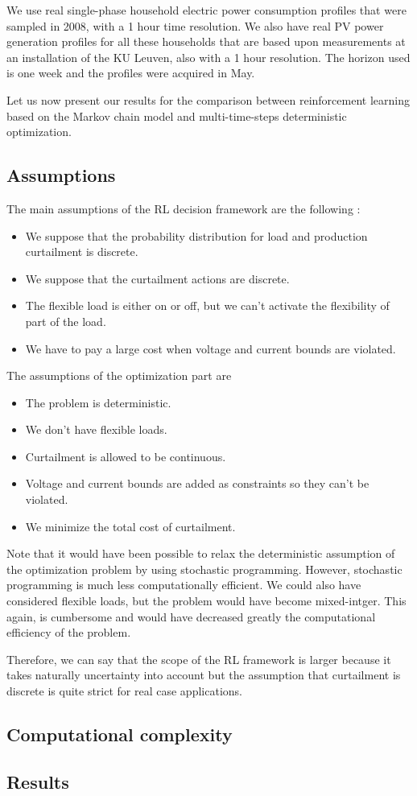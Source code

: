

We use real single-phase household electric power consumption profiles that were sampled in 2008, with a 1 hour time resolution.
We also have real PV power generation profiles for all these households that are based upon measurements at an installation of the KU Leuven, also with a 1 hour resolution.
The horizon used is one week and the profiles were acquired in May.

Let us now present our results for the comparison between reinforcement learning based on the Markov chain model and multi-time-steps deterministic optimization.

\subsection{Assumptions}

The main assumptions of the RL decision framework are the following :
\begin{itemize}
\item We suppose that the probability distribution for load and production curtailment is discrete.
\item We suppose that the curtailment actions are discrete.
\item The flexible load is either on or off, but we can't activate the flexibility of part of the load.
\item We have to pay a large cost when voltage and current bounds are violated.
\end{itemize}

The assumptions of the optimization part are
\begin{itemize}
\item The problem is deterministic.
\item We don't have flexible loads.
\item Curtailment is allowed to be continuous.
\item Voltage and current bounds are added as constraints so they can't be violated.
\item We minimize the total cost of curtailment. 
\end{itemize}

Note that it would have been possible to relax the deterministic assumption of the optimization problem by using stochastic programming.
However, stochastic programming is much less computationally efficient.
We could also have considered flexible loads, but the problem would have become mixed-intger.
This again, is cumbersome and would have decreased greatly the computational efficiency of the problem.

Therefore, we can say that the scope of the RL framework is larger because it takes naturally uncertainty into account but the assumption that curtailment is discrete is quite strict for real case applications.

\subsection{Computational complexity}



\subsection{Results}
